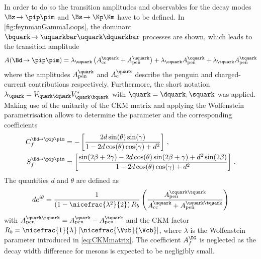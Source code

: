 In order to do so the transition amplitudes and \CP observables for the decay modes $\Bz\!\to\pip\pim$ and $\Bs\!\to\Kp\Km$ have to be defined.
In \cref{fig:feynmanGammaLoops}, the dominant $\bquark\!\to\uquarkbar\uquark\dquarkbar$ processes are shown, which leads to the transition amplitude
\begin{equation}
A\!\left(\Bd\!\to\pip\pim\right)=\lambda_\uquark\left(A_{\text{cc}}^\uquark+A_{\text{pen}}^\uquark\right)+\lambda_\cquark A_{\text{pen}}^\cquark+\lambda_\tquark A_{\text{pen}}^\tquark
\end{equation}
where the amplitudes $A_{\text{pen}}^\quark$ and $A_{\text{c}}^\quark$ describe the penguin and charged-current contributions respectively.
Furthermore, the short notation $\lambda_\quark=V_{{\kern -0.1em}\quark\dquark}V^{*}_{{\kern -0.1em}\quark\bquark}$ with $\quark=\dquark,\squark$ was applied.
Making use of the unitarity of the CKM matrix and applying the Wolfenstein parametrisation \cite{Wolfenstein:1983yz} allows to determine the parameter \Lf and the corresponding \CP coefficients
\begin{equation}
\begin{aligned}
C_{f}^{\Bd\!\to\pip\pim}&=-\left[\frac{2d\sin\!\left(\theta\right)\sin\!\left(\gamma\right)}{1-2d\cos\!\left(\theta\right)\cos\!\left(\gamma\right)+d^2}\right]\,,\\
S_{f}^{\Bd\!\to\pip\pim}&=\left[\frac{\sin\!\left(2\beta+2\gamma\right)-2d\cos\!\left(\theta\right)\sin\!\left(2\beta+\gamma\right)+d^2\sin\!\left(2\beta\right)}{1-2d\cos\!\left(\theta\right)\cos\!\left(\gamma\right)+d^2}\right]\,.
\end{aligned}
\end{equation}
The quantities $d$ and $\theta$ are defined as
\begin{equation}
de^{i\theta}=\frac{1}{\left(1-\nicefrac{\lambda^2}{2}\right)R_b}\left(\frac{A_{\text{pen}}^{\cquark\tquark}}{A_{\text{cc}}^{\uquark}+A_{\text{pen}}^{\uquark\tquark}}\right)
\end{equation}
with $A_{\text{pen}}^{\quark\tquark}=A_{\text{pen}}^{\quark}-A_{\text{pen}}^{\tquark}$ and the CKM factor $R_b=\nicefrac{1}{\lambda}\left|\nicefrac{\Vub}{\Vcb}\right|$, where $\lambda$ is the Wolfenstein parameter introduced in \cref{eq:CKMmatrix}.
The \CP coefficient $A_f^{\DG}$ is neglected as the decay width difference for \Bd mesons is expected to be negligibly small.

